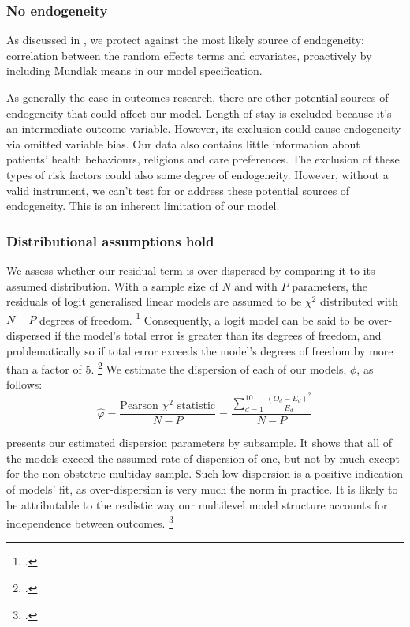 \documentclass[submission]{grattan}
\begin{document}
\subsubsection{No endogeneity}\label{subsubsec:no-endogeneity}

As discussed in , we protect against the most likely source of endogeneity: correlation between the random effects terms and covariates, proactively by including Mundlak means in our model specification.

As generally the case in outcomes research, there are other potential sources of endogeneity that could affect our model.
Length of stay is excluded because it's an intermediate outcome variable.
However, its exclusion could cause endogeneity via omitted variable bias.
Our data also contains little information about patients' health behaviours, religions and care preferences.
The exclusion of these types of risk factors could also some degree of endogeneity.
However, without a valid instrument, we can't test for or address these potential sources of endogeneity.
This is an inherent limitation of our model.

\subsubsection{Distributional assumptions hold}\label{subsubsec:distributional-assumptions-hold}

We assess whether our residual term is over-dispersed by comparing it to its assumed distribution.
With a sample size of \(N\) and with \(P\) parameters, the residuals of logit generalised linear models are assumed to be \(\chi^2\) distributed with \(N - P\) degrees of freedom.%
	\footcite{Collett-2003}
Consequently, a logit model can be said to be over-dispersed if the model's total error is greater than its degrees of freedom, and problematically so if total error exceeds the model's degrees of freedom by more than a factor of 5.%
	\footcite{CARRUTHERS_2008}
We estimate the dispersion of each of our models, \(\phi\), as follows:
\[\hat{\varphi}  = \frac{\text{Pearson \(\chi^{2}\) statistic}}{N - P} = \frac{\sum_{d = 1}^{10}\frac{\left( O_{d} - E_{d} \right)^{2}}{E_{d}}}{N - P}\]

 presents our estimated dispersion parameters by subsample.
It shows that all of the models exceed the assumed rate of dispersion of one, but not by much except for the non-obstetric multiday sample.
Such low dispersion is a positive indication of models' fit, as over-dispersion is very much the norm in practice.
It is likely to be attributable to the realistic way our multilevel model structure accounts for independence between outcomes.%
	\footcite{Stata-multilevel-modelling}
\end{document}
